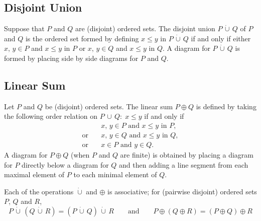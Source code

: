 \documentclass[../main-sheet.tex]{subfiles}
\begin{document}
\subsection{Disjoint Union}
Suppose that \(P\) and \(Q\) are (disjoint) ordered sets. The disjoint union \(P\,
\dot{\cup}\, Q\) of \(P\) and \(Q\) is the ordered set formed by defining \(x \leq y\) in \(P\,\dot{\cup}\, Q\) if and only if either \(x,\, y \in P\) and \(x \leq y\) in \(P\) or \(x,\, y \in Q\) and \(x \leq y\) in \(Q\). A diagram for \(P\,\dot{\cup}\, Q\) is formed by placing side by side diagrams for \(P\) and \(Q\).
\subsection{Linear Sum}
Let \(P\) and \(Q\) be (disjoint) ordered sets. The linear sum \(P \oplus Q\) is defined by taking the following order relation on \(P\,\cup\,Q:\;x \leq y\) if and only if
\begin{align*}
    &x,\,y \in P \text{ and } x \leq y \text{ in } P,\\
    \text{or}\quad& x,\,y \in Q \text{ and } x \leq y \text{ in } Q,\\
    \text{or}\quad& x \in P \text{ and } y\in  Q.
\end{align*}
A diagram for \(P \oplus Q\) (when \(P\) and \(Q\) are finite) is obtained by placing a diagram for \(P\) directly below a diagram for \(Q\) and then adding a line segment from each maximal element of \(P\) to each minimal element of \(Q\).
\begin{note}
    Each of the operations \(\dot{\cup}\) and \(\oplus\) is associative; for (pairwise disjoint) ordered sets \(P\), \(Q\) and \(R\),
    \[
        P\,\dot{\cup}\,(Q\,\dot{\cup}\,R) = (P\,\dot{\cup}\,Q)\,\dot{\cup}\,R \qquad\text{and}\qquad P \oplus (Q \oplus R) = (P \oplus Q) \oplus R
        \]
\end{note}
\end{document}
